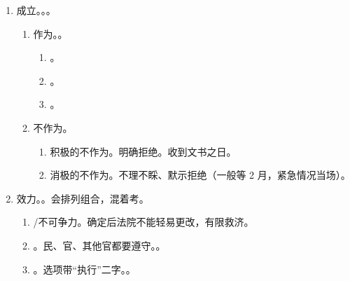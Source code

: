 \begin{enumerate}
\begin{enumerate}
                \begin{enumerate}
                  \item 行政机关有作为义务。
                  \item 没有履行作为义务。完全不去履行，履行部分不算。拖延履行 \yjt 等 2 月。
                  \item 没有履行作为义务没有合法理由。
                \end{enumerate}
          \item 受益、负担。给我好处/给我义务，让我不爽。受益、负担，不是处分、负担。
          \item 单方、双方。
        \end{enumerate}
  \item 成立。。。
        \begin{enumerate}
          \item 作为。。
                \begin{enumerate}
                  \item {}。
                  \item {}。
                  \item {}。
                \end{enumerate}
          \item 不作为。
                \begin{enumerate}
                  \item 积极的不作为。明确拒绝。收到文书之日。
                  \item 消极的不作为。不理不睬、默示拒绝（一般等 2 月，紧急情况当场）。
                \end{enumerate}
        \end{enumerate}
  \item 效力。。会排列组合，混着考。
        \begin{enumerate}
          \item {}/不可争力。确定后法院不能轻易更改，有限救济。
          \item {}。民、官、其他官都要遵守。。
          \item {}。选项带“执行”二字。。

\end{enumerate}
\end{enumerate}
